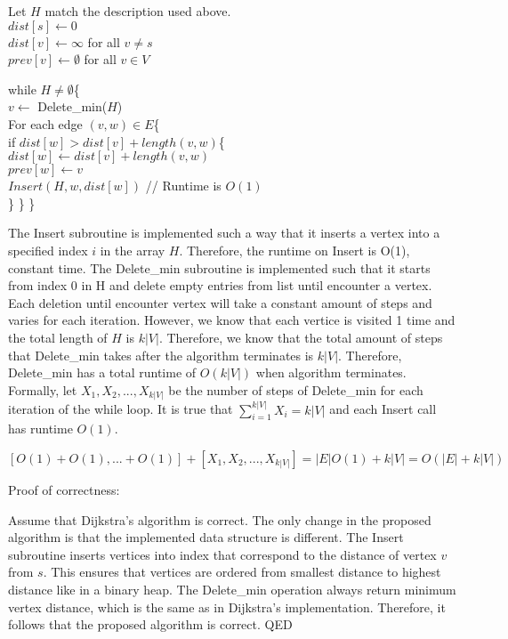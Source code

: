 \documentclass[11pt]{article}
\begin{document}
Let \(H\) match the description used above.\\
\(dist[s] \leftarrow 0\)\\
\(dist[v] \leftarrow \infty\) for all \(v \neq s\)\\
\(prev[v] \leftarrow \emptyset\) for all \(v \in V\)

while \(H \neq \emptyset\)\{\\
\(v \leftarrow\) Delete\_min(\(H\))\\
For each edge \((v,w) \in E\)\{\\
if \(dist[w] > dist[v] + length(v,w)\)\{\\
\(dist[w] \leftarrow dist[v] + length(v,w)\)\\
\(prev[w] \leftarrow v\)\\
\(Insert(H, w, dist[w])\) // Runtime is \(O(1)\)\\
\} \} \}

    The Insert subroutine is implemented such a way that it inserts a vertex
into a specified index \(i\) in the array \(H\). Therefore, the runtime
on Insert is O(1), constant time. The Delete\_min subroutine is
implemented such that it starts from index 0 in H and delete empty
entries from list until encounter a vertex. Each deletion until
encounter vertex will take a constant amount of steps and varies for
each iteration. However, we know that each vertice is visited 1 time and
the total length of \(H\) is \(k|V|\). Therefore, we know that the total
amount of steps that Delete\_min takes after the algorithm terminates is
\(k|V|\). Therefore, Delete\_min has a total runtime of \(O(k|V|)\) when
algorithm terminates. Formally, let \(X_{1}, X_{2}, ..., X_{k|V|}\) be
the number of steps of Delete\_min for each iteration of the while loop.
It is true that \(\sum_{i=1}^{k|V|} X_{i} = k|V|\) and each Insert call
has runtime \(O(1)\).

\([O(1) + O(1), ... + O(1)] + [X_{1}, X_{2}, ..., X_{k|V|}] = |E|O(1) + k|V| = O(|E| + k|V|)\)

    Proof of correctness:

Assume that Dijkstra's algorithm is correct. The only change in the
proposed algorithm is that the implemented data structure is different.
The Insert subroutine inserts vertices into index that correspond to the
distance of vertex \(v\) from \(s\). This ensures that vertices are
ordered from smallest distance to highest distance like in a binary
heap. The Delete\_min operation always return minimum vertex distance,
which is the same as in Dijkstra's implementation. Therefore, it follows
that the proposed algorithm is correct. QED
\end{document}
